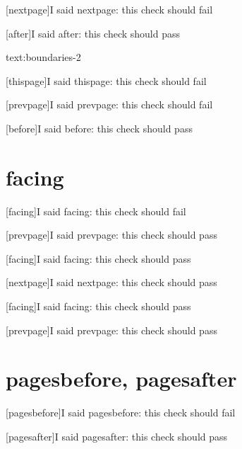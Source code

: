 \documentclass{book}
\begin{document}
[nextpage]{I said nextpage: this check should fail}

[after]{I said after: this check should pass}

\vspace{40\baselineskip}

\begin{zrcregion}{text:boundaries-2}
  \lipsum[5]
\end{zrcregion}

[thispage]{I said thispage: this check should fail}

[prevpage]{I said prevpage: this check should fail}

[before]{I said before: this check should pass}

\chapter{facing}

\clearpage{}

[facing]{I said facing: this check should fail}

[prevpage]{I said prevpage: this check should pass}


[facing]{I said facing: this check should pass}

[nextpage]{I said nextpage: this check should pass}

\clearpage{}

[facing]{I said facing: this check should pass}

[prevpage]{I said prevpage: this check should pass}


\chapter{pagesbefore, pagesafter}


[pagesbefore]{I said pagesbefore: this check should fail}

[pagesafter]{I said pagesafter: this check should pass}
\end{document}
